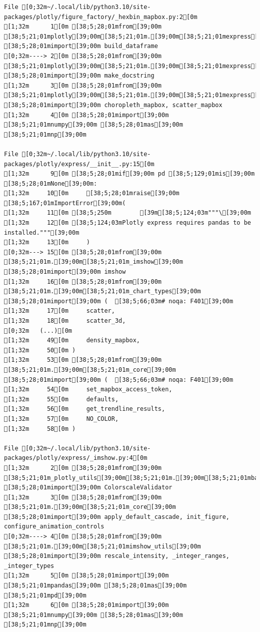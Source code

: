 \documentclass[
  letterpaper,
]{book}
\begin{document}
\begin{verbatim}
File [0;32m~/.local/lib/python3.10/site-packages/plotly/figure_factory/_hexbin_mapbox.py:2[0m
[1;32m      1[0m [38;5;28;01mfrom[39;00m [38;5;21;01mplotly[39;00m[38;5;21;01m.[39;00m[38;5;21;01mexpress[39;00m[38;5;21;01m.[39;00m[38;5;21;01m_core[39;00m [38;5;28;01mimport[39;00m build_dataframe
[0;32m----> 2[0m [38;5;28;01mfrom[39;00m [38;5;21;01mplotly[39;00m[38;5;21;01m.[39;00m[38;5;21;01mexpress[39;00m[38;5;21;01m.[39;00m[38;5;21;01m_doc[39;00m [38;5;28;01mimport[39;00m make_docstring
[1;32m      3[0m [38;5;28;01mfrom[39;00m [38;5;21;01mplotly[39;00m[38;5;21;01m.[39;00m[38;5;21;01mexpress[39;00m[38;5;21;01m.[39;00m[38;5;21;01m_chart_types[39;00m [38;5;28;01mimport[39;00m choropleth_mapbox, scatter_mapbox
[1;32m      4[0m [38;5;28;01mimport[39;00m [38;5;21;01mnumpy[39;00m [38;5;28;01mas[39;00m [38;5;21;01mnp[39;00m

File [0;32m~/.local/lib/python3.10/site-packages/plotly/express/__init__.py:15[0m
[1;32m      9[0m [38;5;28;01mif[39;00m pd [38;5;129;01mis[39;00m [38;5;28;01mNone[39;00m:
[1;32m     10[0m     [38;5;28;01mraise[39;00m [38;5;167;01mImportError[39;00m(
[1;32m     11[0m [38;5;250m        [39m[38;5;124;03m"""\[39;00m
[1;32m     12[0m [38;5;124;03mPlotly express requires pandas to be installed."""[39;00m
[1;32m     13[0m     )
[0;32m---> 15[0m [38;5;28;01mfrom[39;00m [38;5;21;01m.[39;00m[38;5;21;01m_imshow[39;00m [38;5;28;01mimport[39;00m imshow
[1;32m     16[0m [38;5;28;01mfrom[39;00m [38;5;21;01m.[39;00m[38;5;21;01m_chart_types[39;00m [38;5;28;01mimport[39;00m (  [38;5;66;03m# noqa: F401[39;00m
[1;32m     17[0m     scatter,
[1;32m     18[0m     scatter_3d,
[0;32m   (...)[0m
[1;32m     49[0m     density_mapbox,
[1;32m     50[0m )
[1;32m     53[0m [38;5;28;01mfrom[39;00m [38;5;21;01m.[39;00m[38;5;21;01m_core[39;00m [38;5;28;01mimport[39;00m (  [38;5;66;03m# noqa: F401[39;00m
[1;32m     54[0m     set_mapbox_access_token,
[1;32m     55[0m     defaults,
[1;32m     56[0m     get_trendline_results,
[1;32m     57[0m     NO_COLOR,
[1;32m     58[0m )

File [0;32m~/.local/lib/python3.10/site-packages/plotly/express/_imshow.py:4[0m
[1;32m      2[0m [38;5;28;01mfrom[39;00m [38;5;21;01m_plotly_utils[39;00m[38;5;21;01m.[39;00m[38;5;21;01mbasevalidators[39;00m [38;5;28;01mimport[39;00m ColorscaleValidator
[1;32m      3[0m [38;5;28;01mfrom[39;00m [38;5;21;01m.[39;00m[38;5;21;01m_core[39;00m [38;5;28;01mimport[39;00m apply_default_cascade, init_figure, configure_animation_controls
[0;32m----> 4[0m [38;5;28;01mfrom[39;00m [38;5;21;01m.[39;00m[38;5;21;01mimshow_utils[39;00m [38;5;28;01mimport[39;00m rescale_intensity, _integer_ranges, _integer_types
[1;32m      5[0m [38;5;28;01mimport[39;00m [38;5;21;01mpandas[39;00m [38;5;28;01mas[39;00m [38;5;21;01mpd[39;00m
[1;32m      6[0m [38;5;28;01mimport[39;00m [38;5;21;01mnumpy[39;00m [38;5;28;01mas[39;00m [38;5;21;01mnp[39;00m


\end{verbatim}
\end{document}
